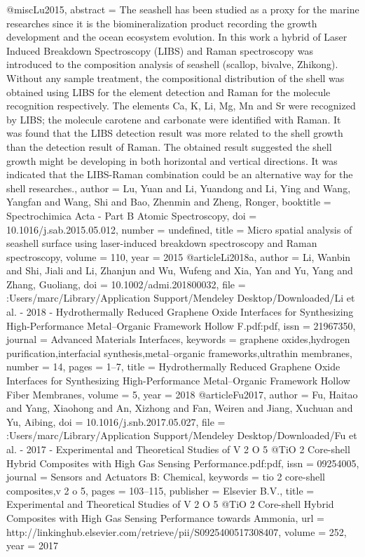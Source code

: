 @misc{Lu2015,
abstract = {The seashell has been studied as a proxy for the marine researches since it is the biomineralization product recording the growth development and the ocean ecosystem evolution. In this work a hybrid of Laser Induced Breakdown Spectroscopy (LIBS) and Raman spectroscopy was introduced to the composition analysis of seashell (scallop, bivalve, Zhikong). Without any sample treatment, the compositional distribution of the shell was obtained using LIBS for the element detection and Raman for the molecule recognition respectively. The elements Ca, K, Li, Mg, Mn and Sr were recognized by LIBS; the molecule carotene and carbonate were identified with Raman. It was found that the LIBS detection result was more related to the shell growth than the detection result of Raman. The obtained result suggested the shell growth might be developing in both horizontal and vertical directions. It was indicated that the LIBS-Raman combination could be an alternative way for the shell researches.},
author = {Lu, Yuan and Li, Yuandong and Li, Ying and Wang, Yangfan and Wang, Shi and Bao, Zhenmin and Zheng, Ronger},
booktitle = {Spectrochimica Acta - Part B Atomic Spectroscopy},
doi = {10.1016/j.sab.2015.05.012},
number = {undefined},
title = {{Micro spatial analysis of seashell surface using laser-induced breakdown spectroscopy and Raman spectroscopy}},
volume = {110},
year = {2015}
}
@article{Li2018a,
author = {Li, Wanbin and Shi, Jiali and Li, Zhanjun and Wu, Wufeng and Xia, Yan and Yu, Yang and Zhang, Guoliang},
doi = {10.1002/admi.201800032},
file = {:Users/marc/Library/Application Support/Mendeley Desktop/Downloaded/Li et al. - 2018 - Hydrothermally Reduced Graphene Oxide Interfaces for Synthesizing High-Performance Metal–Organic Framework Hollow F.pdf:pdf},
issn = {21967350},
journal = {Advanced Materials Interfaces},
keywords = {graphene oxides,hydrogen purification,interfacial synthesis,metal–organic frameworks,ultrathin membranes},
number = {14},
pages = {1--7},
title = {{Hydrothermally Reduced Graphene Oxide Interfaces for Synthesizing High-Performance Metal–Organic Framework Hollow Fiber Membranes}},
volume = {5},
year = {2018}
}
@article{Fu2017,
author = {Fu, Haitao and Yang, Xiaohong and An, Xizhong and Fan, Weiren and Jiang, Xuchuan and Yu, Aibing},
doi = {10.1016/j.snb.2017.05.027},
file = {:Users/marc/Library/Application Support/Mendeley Desktop/Downloaded/Fu et al. - 2017 - Experimental and Theoretical Studies of V 2 O 5 @TiO 2 Core-shell Hybrid Composites with High Gas Sensing Performance.pdf:pdf},
issn = {09254005},
journal = {Sensors and Actuators B: Chemical},
keywords = {tio 2 core-shell composites,v 2 o 5},
pages = {103--115},
publisher = {Elsevier B.V.},
title = {{Experimental and Theoretical Studies of V 2 O 5 @TiO 2 Core-shell Hybrid Composites with High Gas Sensing Performance towards Ammonia}},
url = {http://linkinghub.elsevier.com/retrieve/pii/S0925400517308407},
volume = {252},
year = {2017}
}
